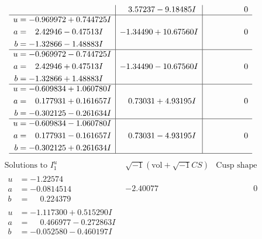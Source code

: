 \documentclass[1p]{elsarticle_modified}
\theoremstyle{definition}
\newcommand{\I}{\sqrt{-1}}
\begin{document}
$$\begin{array}{c|c|c}
 & \phantom{-}3.57237 - 9.18485 I & \phantom{-0.000000 } 0 \\ \hline\begin{aligned}
u &= -0.969972 + 0.744725 I \\
a &= \phantom{-}2.42946 - 0.47513 I \\
b &= -1.32866 - 1.48883 I\end{aligned}
 & -1.34490 + 10.67560 I & \phantom{-0.000000 } 0 \\ \hline\begin{aligned}
u &= -0.969972 - 0.744725 I \\
a &= \phantom{-}2.42946 + 0.47513 I \\
b &= -1.32866 + 1.48883 I\end{aligned}
 & -1.34490 - 10.67560 I & \phantom{-0.000000 } 0 \\ \hline\begin{aligned}
u &= -0.609834 + 1.060780 I \\
a &= \phantom{-}0.177931 + 0.161657 I \\
b &= -0.302125 - 0.261634 I\end{aligned}
 & \phantom{-}0.73031 + 4.93195 I & \phantom{-0.000000 } 0 \\ \hline\begin{aligned}
u &= -0.609834 - 1.060780 I \\
a &= \phantom{-}0.177931 - 0.161657 I \\
b &= -0.302125 + 0.261634 I\end{aligned}
 & \phantom{-}0.73031 - 4.93195 I & \phantom{-0.000000 } 0\\
 \hline 
 \end{array}$$\newpage$$\begin{array}{c|c|c}  
\text{Solutions to }I^u_{1}& \I (\text{vol} + \sqrt{-1}CS) & \text{Cusp shape}\\
 \hline 
\begin{aligned}
u &= -1.22574\phantom{ +0.000000I} \\
a &= -0.0814514\phantom{ +0.000000I} \\
b &= \phantom{-}0.224379\phantom{ +0.000000I}\end{aligned}
 & -2.40077\phantom{ +0.000000I} & \phantom{-0.000000 } 0 \\ \hline\begin{aligned}
u &= -1.117300 + 0.515290 I \\
a &= \phantom{-}0.466977 - 0.272863 I \\
b &= -0.052580 - 0.460197 I\end{aligned}

\end{array}$$
\end{document}
